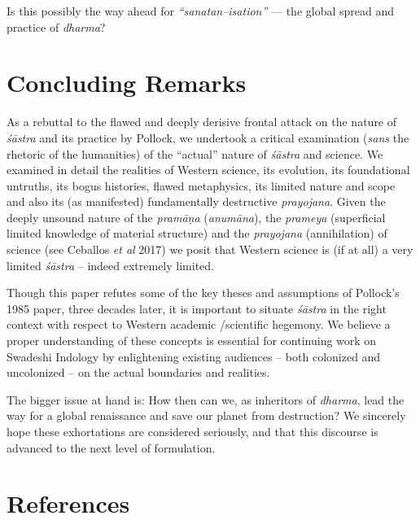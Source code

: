 Is this possibly the way ahead for \textit{“sanatan–isation”} — the global spread and practice of \textit{dharma}?


\section*{Concluding Remarks}

As a rebuttal to the flawed and deeply derisive frontal attack on the nature of \textit{śāstra} and its practice by Pollock, we undertook a critical examination (\textit{sans} the rhetoric of the humanities) of the “actual” nature of \textit{śāstra} and science. We examined in detail the realities of Western science, its evolution, its foundational untruths, its bogus histories, flawed metaphysics, its limited nature and scope and also its (as manifested) fundamentally destructive \textit{prayojana}. Given the deeply unsound nature of the \textit{pramāṇa} (\textit{anumāna}), the \textit{prameya} (superficial limited knowledge of material structure) and the \textit{prayojana} (annihilation) of science (see Ceballos \textit{et al} 2017) we posit that Western science is (if at all) a very limited \textit{śāstra} – indeed extremely limited.

Though this paper refutes some of the key theses and assumptions of Pollock’s 1985 paper, three decades later, it is important to situate \textit{śāstra} in the right context with respect to Western academic /scientific hegemony. We believe a proper understanding of these concepts is essential for continuing work on Swadeshi Indology by enlightening existing audiences – both colonized and uncolonized – on the actual boundaries and realities.

The bigger issue at hand is: How then can we, as inheritors of \textit{dharma}, lead the way for a global renaissance and save our planet from destruction? We sincerely hope these exhortations are considered seriously, and that this discourse is advanced to the next level of formulation.

\newpage


\section*{References}

